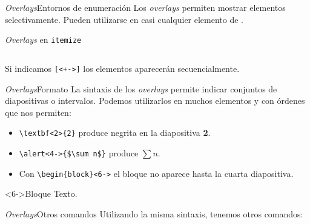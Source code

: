 \begin{frame}[fragile]{\textit{Overlays}}{Entornos de enumeración}
  Los \textit{overlays} permiten mostrar elementos selectivamente.
  Pueden utilizarse en casi cualquier elemento de \beamer.

  \espacio

  \begin{exampleblock}{\textit{Overlays} en \texttt{itemize}}

  \begin{columns}
  \end{columns}
  \espacio
  Si indicamos \texttt{[<+->]} los elementos aparecerán secuencialmente.
  \end{exampleblock}
\end{frame}

\begin{frame}{\textit{Overlays}}{Formato}
  La sintaxis de los \textit{overlays} permite indicar conjuntos de diapositivas
  o intervalos. Podemos utilizarlos en muchos elementos y con órdenes que nos permiten:
    \espacio

    \begin{itemize}
      \item \texttt{\textbackslash{\color{keywords}textbf}\alert<1>{<2>}\{2\}}
      produce  negrita en la diapositiva \textbf<2>{2}.

      \item
      \texttt{\textbackslash{\color{keywords}alert}\alert<3>{<4->}\{\$\textbackslash sum n\$\}}
      produce \alert<4->{$\sum n$}.

      \item Con \texttt{\textbackslash{\color{keywords}begin}\{block\}\alert<5>{<6->}} el
      bloque no aparece hasta la cuarta diapositiva.
    \end{itemize}

    \begin{block}<6->{Bloque}
      Texto.
    \end{block}
\end{frame}

\begin{frame}[fragile]{\textit{Overlays}}{Otros comandos}
  Utilizando la misma sintaxis, tenemos otros comandos:
  \espacio
\end{frame}

